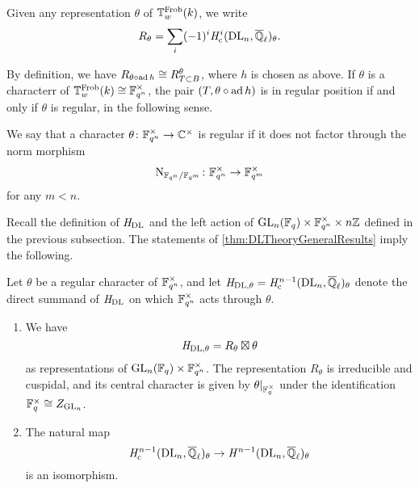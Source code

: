 \documentclass[../main.tex]{subfiles}
\begin{document}
Given any representation $\theta$ of $\mathbb{T}^{\mathrm{Frob}}_w(k)$, we write
\begin{equation*}
  R_\theta = \sum_i (-1)^i \mathit H_{\mathrm{c}}^i(\mathrm{DL}_n, \overline {\mathbb{Q}}_\ell)_\theta.
\end{equation*}

By definition, we have $R_{\theta \circ \operatorname{ad} h} \cong R^\theta_{T\subset B}$,
where $h$ is chosen as above. If $\theta$ is a
characterr of $\mathbb{T}_w^{\mathrm{Frob}}(k) \cong \mathbb{F}_{q^n}^\times$, the pair $(T, \theta \circ \operatorname{ad}
h)$ is in regular position if and only if $\theta$ is regular, in the following
sense.

\begin{defi}\label{def:RegChar}
  We say that a character $\theta\colon  \mathbb{F}_{q^n}^\times \to \mathbb{C}^\times$ is 
  regular if it does not factor through the norm morphism
  $$\operatorname{N}_{\mathbb{F}_{q^n}/\mathbb{F}_{q^m}}\colon \mathbb{F}_{q^n}^\times \to \mathbb{F}_{q^m}^\times$$ 
  for any $m < n$.
\end{defi}

Recall the definition of $\mathit H_{\mathrm{DL}}$ and the left action of 
$\operatorname{GL}_n(\mathbb{F}_q) \times \mathbb{F}_{q^n}^\times \times 
n \mathbb{Z}$ defined in the previous subsection. 
The statements of \cref{thm:DLTheoryGeneralResults} imply
the following.

\begin{thm}\label{thm:DLCorrespondenceForUs}
  Let $\theta$ be a regular character of $\mathbb{F}_{q^n}^\times$, and let
  $\mathit H_{\mathrm{DL},\theta} = \mathit H_{\mathrm{c}}^{n-1}(\mathrm{DL}_n, \overline {\mathbb{Q}}_\ell)_\theta$ denote the direct
  summand of $\mathit H_\mathrm{DL}$ on which $\mathbb{F}_{q^n}^\times$
  acts through $\theta$. 
  \begin{enumerate}
    \item We have
      \begin{equation*}
        \mathit H_{\mathrm{DL},\theta} = R_\theta \boxtimes
        \theta
      \end{equation*}
      as representations of $\operatorname{GL}_n(\mathbb{F}_q) \times \mathbb{F}_{q^n}^\times$.
      The representation $R_\theta$ is irreducible and cuspidal, and its central
      character is given by $\theta|_{\mathbb{F}_q^\times}$ under the identification
      $\mathbb{F}_q^\times \cong Z_{\operatorname{GL}_n}$.
    \item The natural map 
      \begin{equation*}
        \mathit H_{\mathrm{c}}^{n-1}(\mathrm{DL}_n, \overline {\mathbb{Q}}_\ell)_\theta \to
        \mathit H^{n-1}(\mathrm{DL}_n, \overline {\mathbb{Q}}_\ell)_\theta
      \end{equation*}
      is an isomorphism.
  \end{enumerate}
\end{thm}
\end{document}
